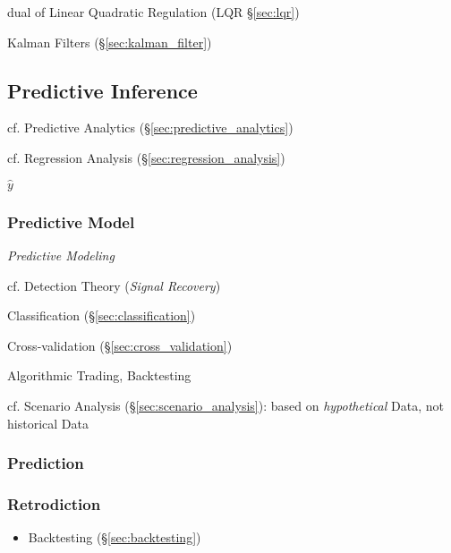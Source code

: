 dual of Linear Quadratic Regulation (LQR \S\ref{sec:lqr})

\fist Kalman Filters (\S\ref{sec:kalman_filter})



\subsection{Predictive Inference}\label{sec:predictive_inference}

cf. Predictive Analytics (\S\ref{sec:predictive_analytics})

\fist cf. Regression Analysis (\S\ref{sec:regression_analysis})

$\hat{y}$



\subsubsection{Predictive Model}\label{sec:predictive_model}

\emph{Predictive Modeling}

cf. Detection Theory (\emph{Signal Recovery}) %

Classification (\S\ref{sec:classification})

Cross-validation (\S\ref{sec:cross_validation})

Algorithmic Trading, Backtesting

cf. Scenario Analysis (\S\ref{sec:scenario_analysis}): based on
\emph{hypothetical} Data, not historical Data



\subsubsection{Prediction}\label{sec:prediction}

\subsubsection{Retrodiction}\label{sec:retrodiction}

\begin{itemize}
  \item Backtesting (\S\ref{sec:backtesting})
\end{itemize}



